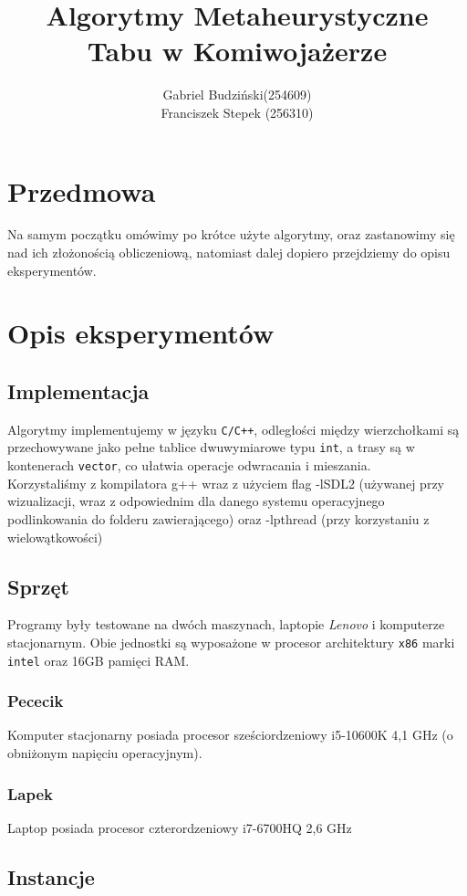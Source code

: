\documentclass{article}
\title{\textbf{Algorytmy Metaheurystyczne\\Tabu w Komiwojażerze}}
\author{Gabriel Budziński(254609)\\Franciszek Stepek (256310)}
\date{}
\begin{document}
 
\maketitle

\section*{Przedmowa}
Na samym początku omówimy po krótce użyte algorytmy, oraz zastanowimy się nad ich złożonością obliczeniową, natomiast dalej dopiero przejdziemy do opisu eksperymentów.

\section{Opis eksperymentów}
\subsection{Implementacja}
Algorytmy implementujemy w języku \texttt{C/C++}, odległości między wierzchołkami są przechowywane jako pełne tablice dwuwymiarowe typu \texttt{int}, a trasy są w kontenerach \texttt{vector}, co ułatwia operacje odwracania i mieszania.\\
Korzystaliśmy z kompilatora g++ wraz z użyciem flag -lSDL2 (używanej przy wizualizacji, wraz z odpowiednim dla danego systemu operacyjnego podlinkowania do folderu zawierającego) oraz -lpthread (przy korzystaniu z wielowątkowości)

\subsection{Sprzęt}
Programy były testowane na dwóch maszynach, laptopie \textit{Lenovo} i komputerze stacjonarnym. Obie jednostki są wyposażone w procesor architektury \texttt{x86} marki \texttt{intel} oraz 16GB pamięci RAM.

\subsubsection{Pececik}
Komputer stacjonarny posiada procesor sześciordzeniowy i5-10600K 4,1 GHz (o obniżonym napięciu operacyjnym).
\subsubsection{Lapek}
Laptop posiada procesor czterordzeniowy i7-6700HQ 2,6 GHz

\subsection{Instancje}
\end{document}
